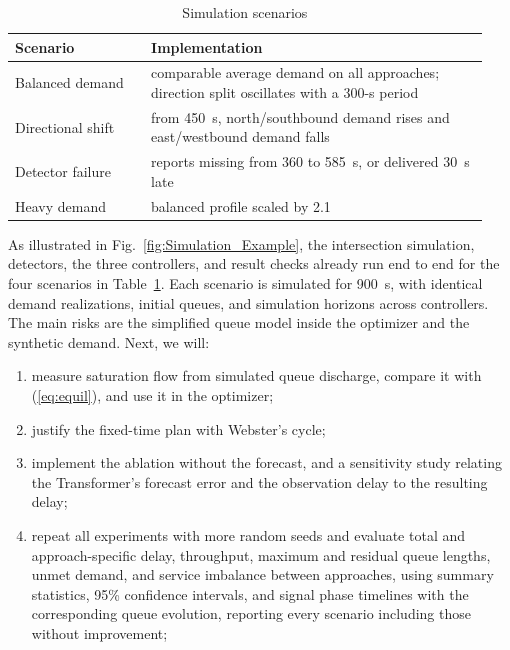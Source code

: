 \documentclass[letterpaper,12pt,conference]{ieeeconf}
\begin{document}
\begin{table}[t]
\caption{Simulation scenarios}
\label{tab:exp}
\centering
\footnotesize
\setlength{\tabcolsep}{3pt}
\begin{tabular}{p{0.27\linewidth}p{0.67\linewidth}}
\toprule
Scenario & Implementation \\
\midrule
Balanced demand & comparable average demand on all approaches;
direction split oscillates with a 300-s period \\
Directional shift & from 450~s, north/southbound demand rises and
east/westbound demand falls \\
Detector failure & reports missing from 360 to 585~s, or
delivered 30~s late \\
Heavy demand & balanced profile scaled by 2.1 \\
\bottomrule
\end{tabular}
\end{table}

As illustrated in Fig.~\ref{fig:Simulation_Example}, the intersection simulation, detectors, the three controllers, and result checks already run end to
end for the four scenarios in Table~\ref{tab:exp}. Each scenario
is simulated for 900~s, with identical demand realizations,
initial queues, and simulation horizons across controllers. The
main risks are the simplified queue model inside the optimizer and
the synthetic demand. Next, we will:
\begin{enumerate}
\item measure saturation flow from simulated queue discharge,
compare it with (\ref{eq:equil}), and use it in the optimizer;
\item justify the fixed-time plan with Webster's cycle;
\item implement the ablation without the forecast, and a
sensitivity study relating the Transformer's forecast error and
the observation delay to the resulting delay;
\item repeat all experiments with more random seeds and evaluate
total and approach-specific delay, throughput, maximum and
residual queue lengths, unmet demand, and service imbalance
between approaches, using summary statistics, 95\% confidence
intervals, and signal phase timelines with the corresponding
queue evolution, reporting every scenario including those without
improvement;

\end{enumerate}
\end{document}
